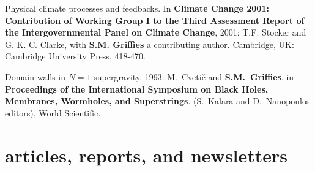 \begin{etaremune}
\item Physical climate processes and feedbacks. In {\bf Climate Change
    2001: Contribution of Working Group I to the Third Assessment
    Report of the Intergovernmental Panel on Climate Change}, 2001:
  T.F. Stocker and G. K. C. Clarke, with {\bf S.M. Grif\/f\/ies} a
  contributing author.  Cambridge, UK: Cambridge University Press,
  418-470.

\item Domain walls in $N=1$ supergravity, 1993: M.\ Cveti\v c and {\bf
    S.M.\ Grif\/f\/ies}, in {\bf Proceedings of the International
    Symposium on Black Holes, Membranes, Wormholes, and Superstrings}.
  (S.\ Kalara and D.\ Nanopoulos editors), World Scientific.

\end{etaremune}

\section*{\sc \color{Maroon} articles, reports, and newsletters}

